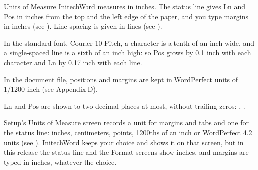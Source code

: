 \begin{Feature}{Units of Measure}
InitechWord measures in inches.  The status line gives Ln and Pos in inches
from the top and the left edge of the paper, and you type margins in inches
(see ).  Line spacing is given in lines (see
).

\Notes
{}
In the standard font, Courier 10 Pitch, a character is a tenth of an inch
wide, and a single-spaced line is a sixth of an inch high: so Pos grows by
0.1 inch with each character and Ln by 0.17 inch with each line.

In the document file, positions and margins are kept in WordPerfect units of
1/1200 inch (see Appendix D).

Ln and Pos are shown to two decimal places at most, without trailing zeros:
, .

Setup's Units of Measure screen records a unit for margins and tabs and one
for the status line: inches, centimeters, points, 1200ths of an inch or
WordPerfect 4.2 units (see ).  InitechWord keeps your choice
and shows it on that screen, but in this release the status line and the
Format screens show inches, and margins are typed in inches, whatever the
choice.

\end{Feature}
